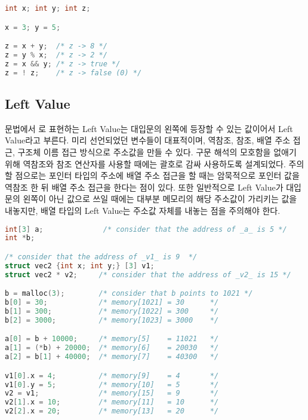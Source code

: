 \begin{lstlisting}[language=C, caption=Operator examples]
int x; int y; int z;

x = 3; y = 5;

z = x + y;  /* z -> 8 */
z = y % x;  /* z -> 2 */
z = x && y; /* z -> true */
z = ! z;    /* z -> false (0) */
\end{lstlisting}




\subsection{Left Value}

문법에서 \LeftValueExpression 로 표현하는 Left Value는 대입문의 왼쪽에 등장할 수 있는 값이어서 Left Value라고 부른다.
미리 선언되었던 변수들이 대표적이며, 역참조, 참조, 배열 주소 접근, 구조체 이름 접근 방식으로 주소값을 만들 수 있다.
구문 해석의 모호함을 없애기 위해 역참조와 참조 연산자를 사용할 때에는 괄호로 감싸 사용하도록 설계되었다. 
주의할 점으로는 포인터 타입의 주소에 배열 주소 접근을 할 때는 암묵적으로 포인터 값을 역참조 한 뒤 배열 주소 접근을 한다는 점이 있다.
또한 일반적으로 Left Value가 대입문의 왼쪽이 아닌 값으로 쓰일 때에는 대부분 메모리의 해당 주소값이 가리키는 값을 내놓지만,
배열 타입의 Left Value는 주소값 자체를 내놓는 점을 주의해야 한다.


\begin{lstlisting}[language=C, caption=Left value examples 1]
int[3] a;              /* consider that the address of _a_ is 5 */
int *b;

/* consider that the address of _v1_ is 9  */
struct vec2 {int x; int y;} [3] v1;  
struct vec2 * v2;     /* consider that the address of _v2_ is 15 */

b = malloc(3);        /* consider that b points to 1021 */
b[0] = 30;            /* memory[1021] = 30      */
b[1] = 300;           /* memory[1022] = 300     */
b[2] = 3000;          /* memory[1023] = 3000    */

a[0] = b + 10000;     /* memory[5]    = 11021   */
a[1] = (*b) + 20000;  /* memory[6]    = 20030   */
a[2] = b[1] + 40000;  /* memory[7]    = 40300   */

v1[0].x = 4;          /* memory[9]    = 4       */
v1[0].y = 5;          /* memory[10]   = 5       */
v2 = v1;              /* memory[15]   = 9       */
v2[1].x = 10;         /* memory[11]   = 10      */
v2[2].x = 20;         /* memory[13]   = 20      */
\end{lstlisting}

